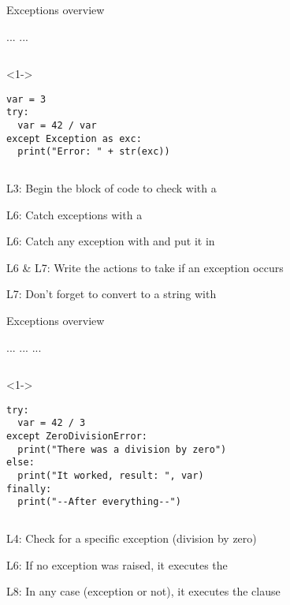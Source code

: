 
\begin{frame}[fragile]{Exceptions overview}

   ...  ...

  \begin{columns}[onlytextwidth]
    \begin{column}{\textwidth}
      \begin{onlyenv}<1->
        \begin{lstlisting}[style=python,morekeywords={as}]
var = 3
try:
  var = 42 / var
except Exception as exc:
  print("Error: " + str(exc)) \end{lstlisting}
      \end{onlyenv}
    \end{column}
  \end{columns}

   L3: Begin the block of code to check with a 

   L6: Catch exceptions with a 

   L6: Catch any exception with  and put it in 

   L6 \& L7: Write the actions to take if an exception occurs

   L7: Don't forget to convert to a string with 

\end{frame}


\begin{frame}[fragile]{Exceptions overview}

   ...  ...  ... 

  \begin{columns}[onlytextwidth]
    \begin{column}{\textwidth}
      \begin{onlyenv}<1->
        \begin{lstlisting}[style=python,morekeywords={as}]
try:
  var = 42 / 3
except ZeroDivisionError:
  print("There was a division by zero")
else:
  print("It worked, result: ", var)
finally:
  print("--After everything--")\end{lstlisting}
      \end{onlyenv}
    \end{column}
  \end{columns}

   L4: Check for a specific exception (division by zero)

   L6: If no exception was raised, it executes the 

   L8: In any case (exception or not), it executes the  clause

\end{frame}


